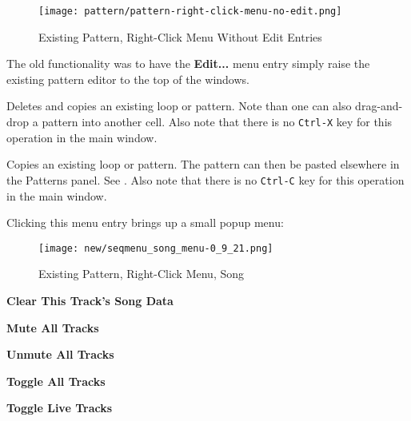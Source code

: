 \begin{figure}[H]
   \centering 
   \texttt{[image: pattern/pattern-right-click-menu-no-edit.png]}
   \caption{Existing Pattern, Right-Click Menu Without Edit Entries}
   \label{fig:pattern_window_right_click_no_edit}
\end{figure}

   The old functionality was to have the \textbf{Edit...} menu entry simply
   raise the existing pattern editor to the top of the windows.

   Deletes and copies an existing loop or pattern.
   Note than one can also drag-and-drop a pattern into another cell.
   Also note that there is no \texttt{Ctrl-X} key for this operation in the
   main window.

%

   Copies an existing loop or pattern.
   The pattern can then be pasted elsewhere in the Patterns panel.
   See .
   Also note that there is no \texttt{Ctrl-C} key for this operation in the
   main window.

   Clicking this menu entry brings up a small popup menu:

\begin{figure}[H]
   \centering 
   \texttt{[image: new/seqmenu\_song\_menu-0\_9\_21.png]}
   \caption{Existing Pattern, Right-Click Menu, Song}
   \label{fig:pattern_window_right_click_song}
\end{figure}

   \begin{enumber}
      \item \textbf{Clear This Track's Song Data}
      \item \textbf{Mute All Tracks}
      \item \textbf{Unmute All Tracks}
      \item \textbf{Toggle All Tracks}
      \item \textbf{Toggle Live Tracks}
   \end{enumber}



